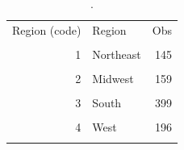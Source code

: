 \begin{table}[htbp]\centering
\caption{.}
\label{tab:bin_counts_censreg_2020}
\begin{tabular}{rlr}\toprule
Region (code) & Region & Obs \\\\ \midrule
1 & Northeast & 145 \\\\
2 & Midwest & 159 \\\\
3 & South & 399 \\\\
4 & West & 196 \\\\
\bottomrule\end{tabular}\end{table}
